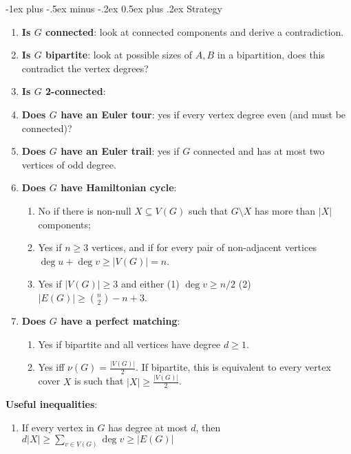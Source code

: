 \documentclass[10pt,landscape]{article}
\makeatletter
\renewcommand{\section}{\@startsection{section}{1}{0mm}%
                                {-1ex plus -.5ex minus -.2ex}%
                                {0.5ex plus .2ex}%
                                {\normalfont\large\bfseries}}
\makeatother
\begin{document}
\begin{multicols}{3}
\section{Strategy}
\begin{enumerate}
	\item \textbf{Is \( G \) connected}: look at connected components and derive a contradiction.
	\item \textbf{Is \( G \) bipartite}: look at possible sizes of \( A,B \) in a bipartition, does this contradict the vertex degrees?
	\item \textbf{Is \( G \) 2-connected}:
	\item \textbf{Does \( G \) have an Euler tour}: yes if every vertex degree even (and must be connected)?
	\item \textbf{Does \( G \) have an Euler trail}: yes if \( G \) connected and has at most two vertices of odd degree. 
	\item \textbf{Does \( G \) have Hamiltonian cycle}:
		\begin{enumerate}
			\item No if there is non-null \( X \subseteq V(G) \) such that \( G \setminus X \) has more than \( |X| \) components;
			\item Yes if \( n \geq 3 \) vertices, and if for every pair of non-adjacent vertices \( \deg u + \deg v \geq |V(G)| = n \).
			\item Yes if \( |V(G)| \geq 3 \) and either (1) \( \deg v \geq n / 2 \) (2) \( |E(G)| \geq \binom{n}{2} - n + 3 \).
			
			
			
		\end{enumerate}
	\item \textbf{Does \( G \) have a perfect matching}:
		\begin{enumerate}
			\item Yes if bipartite and all vertices have degree \( d \geq 1 \).
			\item Yes iff \( \nu (G) = \frac{|V(G)|}{2}  \). If bipartite, this is equivalent to every vertex cover \( X \) is such that \( |X| \geq \frac{|V(G)|}{2}  \).
		\end{enumerate}
\end{enumerate}
\textbf{Useful inequalities}:
\begin{enumerate}
	\item If every vertex in \( G \) has degree at most \( d \), then \( d|X| \geq \sum_{v \in V(G)}^{}\deg v \geq |E(G)| \) 
	
\end{enumerate}
\end{multicols}
\end{document}
